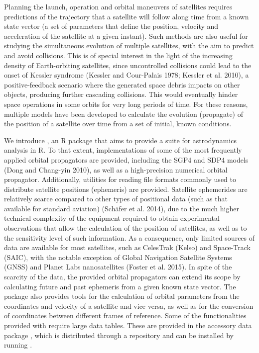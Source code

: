 Planning the launch, operation and orbital maneuvers of satellites requires predictions of the trajectory that a satellite will follow along time from a known state vector (a set of parameters that define the position, velocity and acceleration of the satellite at a given instant). Such methods are also useful for studying the simultaneous evolution of multiple satellites, with the aim to predict and avoid collisions. This is of special interest in the light of the increasing density of Earth-orbiting satellites, since uncontrolled collisions could lead to the onset of Kessler syndrome (Kessler and Cour-Palais 1978; Kessler et al. 2010), a positive-feedback scenario where the generated space debris impacts on other objects, producing further cascading collisions. This would eventually hinder space operations in some orbits for very long periods of time. For these reasons, multiple models have been developed to calculate the evolution (propagate) of the position of a satellite over time from a set of initial, known conditions.

We introduce , an R package that aims to provide a suite for astrodynamics analysis in R. To that extent, implementations of some of the most frequently applied orbital propagators are provided, including the SGP4 and SDP4 models (Dong and Chang-yin 2010), as well as a high-precision numerical orbital propagator. Additionally, utilities for reading file formats commonly used to distribute satellite positions (ephemeris) are provided. Satellite ephemerides are relatively scarce compared to other types of positional data (such as that available for standard aviation) (Schäfer et al. 2014), due to the much higher technical complexity of the equipment required to obtain experimental observations that allow the calculation of the position of satellites, as well as to the sensitivity level of such information. As a consequence, only limited sources of data are available for most satellites, such as CelesTrak (Kelso) and Space-Track (SAIC), with the notable exception of Global Navigation Satellite Systems (GNSS) and Planet Labs nanosatellites (Foster et al. 2015). In spite of the scarcity of the data, the provided orbital propagators can extend its scope by calculating future and past ephemeris from a given known state vector. The package also provides tools for the calculation of orbital parameters from the coordinates and velocity of a satellite and vice versa, as well as for the conversion of coordinates between different frames of reference. Some of the functionalities provided with  require large data tables. These are provided in the accessory data package , which is distributed through a  repository and can be installed by running .

